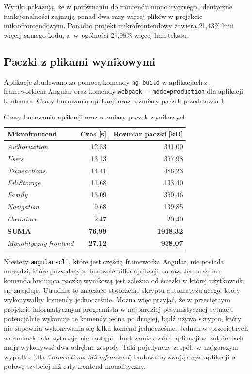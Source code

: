 \documentclass{SGGW-thesis}
\begin{document}
    Wyniki pokazują, że w porównaniu do frontendu monolitycznego, identyczne funkcjonalności zajmują ponad dwa razy więcej plików w projekcie mikrofrontendowym. Ponadto projekt mikrofrontendowy zawiera 21,43\% linii więcej samego kodu, a~w~ogólności 27,98\% więcej linii tekstu.
  
    \subsection{Paczki z plikami wynikowymi}
    Aplikacje zbudowano za pomocą komendy \lstinline{ng build} w aplikacjach z frameworkiem Angular oraz komendy \lstinline{webpack --mode=production} dla aplikacji kontenera. Czasy budowania aplikacji oraz rozmiary paczek przedstawia \cref{table:build_times}.

    \begin{table}[h]
      \centering
      \caption{Czasy budowania aplikacji oraz rozmiary paczek wynikowych}
      \begin{tabular}{|l||r|r|}
      \hline
      \textbf{Mikrofrontend} & \multicolumn{1}{l|}{\textbf{Czas {[}s{]}}} & \multicolumn{1}{l|}{\textbf{Rozmiar paczki {[}kB{]}}} \\ \hline
      \textit{Authorization} & 12,53 & 341,00 \\ \hline
      \textit{Users} & 13,13 & 367,98 \\ \hline
      \textit{Transactions} & 14,41 & 486,23 \\ \hline
      \textit{FileStorage} & 11,68 & 193,40 \\ \hline
      \textit{Family} & 13,09 & 369,46 \\ \hline
      \textit{Navigation} & 9,68 & 139,85 \\ \hline
      \textit{Container} & 2,47 & 20,40 \\ \hline
       \textbf{SUMA} & \textbf{76,99} & \textbf{1918,32} \\ \hline\hline
       \textit{Monolityczny frontend} & \textbf{27,12} & \textbf{938,07} \\ \hline
      \end{tabular}
      \label{table:build_times}
    \end{table}

    Niestety \lstinline{angular-cli}, które jest częścią frameworka Angular, nie posiada narzędzi, które pozwalałyby budować kilka aplikacji na raz. Jednocześnie komenda budująca paczkę wynikową jest zależna od ścieżki w której użytkownik się znajduje. Utrudnia to znacząco stworzenie skryptu automatyzującego, który wykonywałby komendy jednocześnie. Można więc przyjąć, że w przeciętnym projekcie informatycznym programista w najbardziej pesymistycznej sytuacji potencjalnie wykonuje te komendy jedna po drugiej, bądź używa skryptu, który nie zapewnia wykonywania się kilku komend jednocześnie. Jednak w~przeciętnych warunkach taka sytuacja nie nastąpi - budowanie dwóch aplikacji w~założeniach mają wykonywać dwa odrębne zespoły. Taki pojedynczy zespół, w~najgorszym wypadku (dla \textit{Transactions Microfrontend}) budowałby swoją część aplikacji o połowę szybciej niż cały frontend monolityczny.
\end{document}
